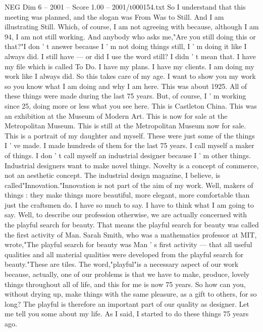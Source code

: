 \begin{textsample}{NEG Dim 6 – 2001 – Score 1.00 – 2001/t000154.txt}  \label{ex:f6_neg_054}
So I understand that this meeting was planned, and the slogan was From Was to Still.
And I am illustrating Still.
Which, of course, I am not agreeing with because, although I am 94, I am not still working.
And anybody who asks me,"Are you still doing this or that?"I don ' t answer because I ' m not doing things still, I ' m doing it like I always did.
I still have — or did I use the word still?
I didn ' t mean that.
I have my file which is called To Do.
I have my plans.
I have my clients.
I am doing my work like I always did.
So this takes care of my age.
I want to show you my work so you know what I am doing and why I am here.
This was about 1925.
All of these things were made during the last 75 years.
But, of course, I ' m working since 25, doing more or less what you see here.
This is Castleton China.
This was an exhibition at the Museum of Modern Art.
This is now for sale at the Metropolitan Museum.
This is still at the Metropolitan Museum now for sale.
This is a portrait of my daughter and myself.
These were just some of the things I ' ve made.
I made hundreds of them for the last 75 years.
I call myself a maker of things.
I don ' t call myself an industrial designer because I ' m other things.
Industrial designers want to make novel things.
Novelty is a concept of commerce, not an aesthetic concept.
The industrial design magazine, I believe, is called"Innovation."Innovation is not part of the aim of my work.
Well, makers of things : they make things more beautiful, more elegant, more comfortable than just the craftsmen do.
I have so much to say.
I have to think what I am going to say.
Well, to describe our profession otherwise, we are actually concerned with the playful search for beauty.
That means the playful search for beauty was called the first activity of Man.
Sarah Smith, who was a mathematics professor at MIT, wrote,"The playful search for beauty was Man ' s first activity — that all useful qualities and all material qualities were developed from the playful search for beauty."These are tiles.
The word,"playful"is a necessary aspect of our work because, actually, one of our problems is that we have to make, produce, lovely things throughout all of life, and this for me is now 75 years.
So how can you, without drying up, make things with the same pleasure, as a gift to others, for so long?
The playful is therefore an important part of our quality as designer.
Let me tell you some about my life.
As I said, I started to do these things 75 years ago.

\end{textsample}
